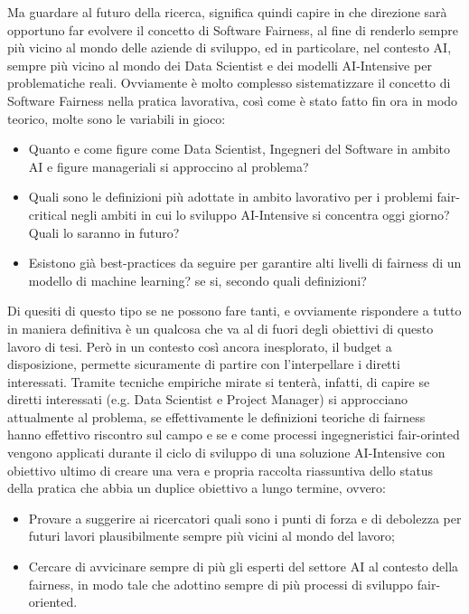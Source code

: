 Ma guardare al futuro della ricerca, significa quindi capire in che direzione sarà opportuno far evolvere il concetto di Software Fairness, al fine di renderlo sempre più vicino al mondo delle aziende di sviluppo, ed in particolare, nel contesto AI, sempre più vicino al mondo dei Data Scientist e dei modelli AI-Intensive per problematiche reali. Ovviamente è molto complesso sistematizzare il concetto di Software Fairness nella pratica lavorativa, così come è stato fatto fin ora in modo teorico, molte sono le variabili in gioco:
\begin{itemize}
    \item Quanto e come figure come Data Scientist, Ingegneri del Software in ambito AI e figure manageriali si approccino al problema? 
    \item Quali sono le definizioni più adottate in ambito lavorativo per i problemi fair-critical negli ambiti in cui lo sviluppo AI-Intensive si concentra oggi giorno? Quali lo saranno in futuro? 
    \item Esistono già best-practices da seguire per garantire alti livelli di fairness di un modello di machine learning? se si, secondo quali definizioni? 
\end{itemize}
 Di quesiti di questo tipo se ne possono fare tanti, e ovviamente rispondere a tutto in maniera definitiva è un qualcosa che va al di fuori degli obiettivi di questo lavoro di tesi. Però in un contesto così ancora inesplorato, il budget a disposizione, permette sicuramente di partire con l'interpellare i diretti interessati. Tramite tecniche empiriche mirate si tenterà, infatti, di capire se diretti interessati (e.g. Data Scientist e Project Manager) si approcciano attualmente al problema, se effettivamente le definizioni teoriche di fairness hanno effettivo riscontro sul campo e se e come processi ingegneristici fair-orinted vengono applicati durante il ciclo di sviluppo di una soluzione AI-Intensive con obiettivo ultimo di creare una vera e propria raccolta riassuntiva dello status della pratica che abbia un duplice obiettivo a lungo termine, ovvero:
 
 \begin{itemize}
     \item Provare a suggerire  ai ricercatori quali sono i punti di forza e di debolezza per futuri lavori plausibilmente sempre più vicini al mondo del lavoro;
     \item Cercare di avvicinare sempre di più gli esperti del settore AI al contesto della fairness, in modo tale che adottino sempre di più processi di sviluppo fair-oriented.
 \end{itemize}


\newpage